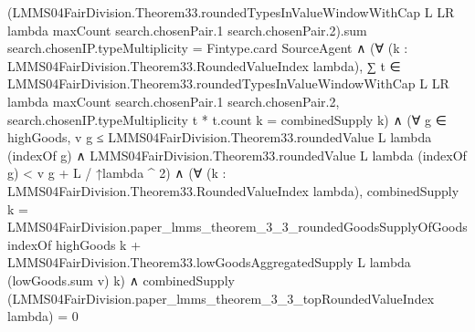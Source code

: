 \documentclass[10pt]{article}
\begin{document}
\begin{ReviewVerbatim}
                                                  (LMMS04FairDivision.Theorem33.roundedTypesInValueWindowWithCap L LR
                                                            lambda maxCount search.chosenPair.1 search.chosenPair.2).sum
                                                        search.chosenIP.typeMultiplicity =
                                                      Fintype.card SourceAgent ∧
                                                    (∀ (k : LMMS04FairDivision.Theorem33.RoundedValueIndex lambda),
                                                        ∑
                                                            t ∈
                                                              LMMS04FairDivision.Theorem33.roundedTypesInValueWindowWithCap
                                                                L LR lambda maxCount search.chosenPair.1
                                                                search.chosenPair.2,
                                                            search.chosenIP.typeMultiplicity t * t.count k =
                                                          combinedSupply k) ∧
                                                      (∀ g ∈ highGoods,
                                                          v g ≤
                                                              LMMS04FairDivision.Theorem33.roundedValue L lambda
                                                                (indexOf g) ∧
                                                            LMMS04FairDivision.Theorem33.roundedValue L lambda
                                                                (indexOf g) <
                                                              v g + L / ↑lambda ^ 2) ∧
                                                        (∀ (k : LMMS04FairDivision.Theorem33.RoundedValueIndex lambda),
                                                            combinedSupply k =
                                                              LMMS04FairDivision.paper_lmms_theorem_3_3_roundedGoodsSupplyOfGoods
                                                                  indexOf highGoods k +
                                                                LMMS04FairDivision.Theorem33.lowGoodsAggregatedSupply L
                                                                  lambda (lowGoods.sum v) k) ∧
                                                          combinedSupply
                                                              (LMMS04FairDivision.paper_lmms_theorem_3_3_topRoundedValueIndex
                                                                lambda) =
                                                            0
\end{ReviewVerbatim}
\end{document}
